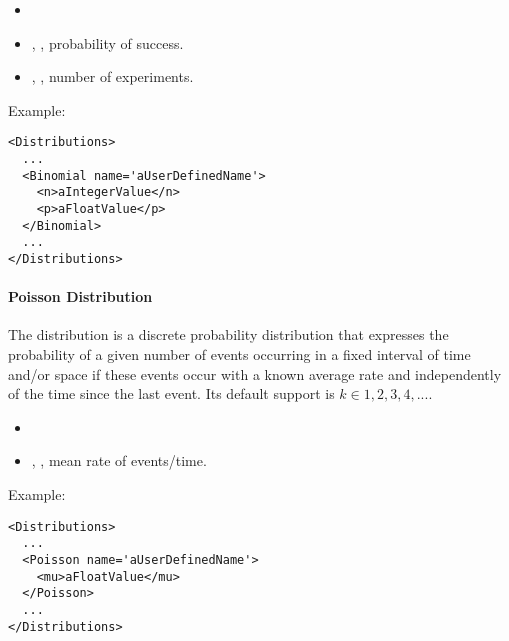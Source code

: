 %
\attrIntro
\vspace{-5mm}
\begin{itemize}
  \itemsep0em
  \item \nameDescription
\end{itemize}
\vspace{-5mm}
\subnodesIntro
\begin{itemize}
  \item {}, , probability of
  success.
  \item {}, , number of
  experiments.
\end{itemize}

Example:
\begin{lstlisting}[style=XML]
<Distributions>
  ...
  <Binomial name='aUserDefinedName'>
    <n>aIntegerValue</n>
    <p>aFloatValue</p>
  </Binomial>
  ...
</Distributions>
\end{lstlisting}

\paragraph{Poisson Distribution}
\label{Poisson}
The  distribution is a discrete probability distribution that
expresses the probability of a given number of events occurring in a fixed
interval of time and/or space if these events occur with a known average rate
and independently of the time since the last event.
%
Its default support is $k \in {1, 2, 3, 4, ...}$.

%
\attrIntro
\vspace{-5mm}
\begin{itemize}
  \itemsep0em
  \item \nameDescription
\end{itemize}
\vspace{-5mm}
\subnodeIntro
\begin{itemize}
  \item {}, , mean rate of
  events/time.
\end{itemize}

Example:
\begin{lstlisting}[style=XML]
<Distributions>
  ...
  <Poisson name='aUserDefinedName'>
    <mu>aFloatValue</mu>
  </Poisson>
  ...
</Distributions>
\end{lstlisting}


